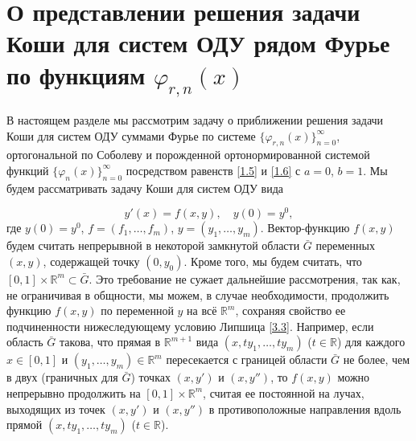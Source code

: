 \section{О представлении решения задачи Коши для систем ОДУ рядом Фурье по функциям $\varphi_{r,n}(x)$}
В настоящем разделе мы рассмотрим задачу о приближении решения задачи Коши для систем ОДУ  суммами  Фурье по системе $\{\varphi_{r,n}(x)\}_{n=0}^\infty$, ортогональной по Соболеву и порожденной ортонормированной системой функций $\{\varphi_{n}(x)\}_{n=0}^\infty$ посредством равенств \eqref{1.5} и \eqref{1.6} с $a=0$, $b=1$.
 Мы будем рассматривать задачу Коши для систем ОДУ вида

\begin{equation}\label{3.1}
y'(x)=f(x,y), \quad y(0)=y^0,
\end{equation}
где $y(0)=y^0$,  $f=(f_1, \ldots, f_m)$, $y=(y_1, \ldots, y_m)$. Вектор-функцию   $f(x,y)$  будем считать непрерывной в некоторой замкнутой  области $\bar G$ переменных $(x,y)$, содержащей точку $(0,y_0)$. Кроме того, мы будем  считать, что  $[0,1]\times\mathbb{R}^m\subset\bar G$. Это требование не сужает дальнейшие рассмотрения, так как, не ограничивая в общности,  мы можем, в случае необходимости, продолжить функцию $f(x,y)$ по переменной $y$ на всё $\mathbb{R}^m$, сохраняя свойство ее подчиненности  нижеследующему условию Липшица \eqref{3.3}. Например, если область $\bar G$ такова, что  прямая в $\mathbb{R}^{m+1}$ вида $(x,ty_1,\ldots,ty_m)$ ($t\in\mathbb{R}$) для каждого $x\in[0,1]$ и $(y_1,\ldots,y_m)\in\mathbb{R}^{m}$ пересекается с границей области $\bar G$ не более, чем в двух (граничных для $\bar G$) точках $(x,y')$ и $(x,y'')$, то  $f(x,y)$ можно непрерывно продолжить   на $[0,1]\times\mathbb{R}^m$, считая ее  постоянной на лучах, выходящих из точек  $(x,y')$ и $(x,y'')$ в противоположные направления вдоль прямой $(x,ty_1,\ldots,ty_m)$ ($t\in\mathbb{R}$).

